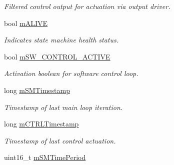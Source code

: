 \begin{DoxyCompactItemize}
\begin{DoxyCompactList}\small\item\em Filtered control output for actuation via output driver. \end{DoxyCompactList}\item 
bool \hyperlink{classSPMB_1_1StateMachine_a856ca0d82b6c3da4d60c1a52d6982faf}{m\+A\+L\+I\+VE}\hypertarget{classSPMB_1_1StateMachine_a856ca0d82b6c3da4d60c1a52d6982faf}{}\label{classSPMB_1_1StateMachine_a856ca0d82b6c3da4d60c1a52d6982faf}

\begin{DoxyCompactList}\small\item\em Indicates state machine health status. \end{DoxyCompactList}\item 
bool \hyperlink{classSPMB_1_1StateMachine_ac0318161d8396b4190dfc57f2d7ca3e5}{m\+S\+W\+\_\+\+C\+O\+N\+T\+R\+O\+L\+\_\+\+A\+C\+T\+I\+VE}\hypertarget{classSPMB_1_1StateMachine_ac0318161d8396b4190dfc57f2d7ca3e5}{}\label{classSPMB_1_1StateMachine_ac0318161d8396b4190dfc57f2d7ca3e5}

\begin{DoxyCompactList}\small\item\em Activation boolean for software control loop. \end{DoxyCompactList}\item 
long \hyperlink{classSPMB_1_1StateMachine_a372848ebc671d9a34982345bc90a255d}{m\+S\+M\+Timestamp}\hypertarget{classSPMB_1_1StateMachine_a372848ebc671d9a34982345bc90a255d}{}\label{classSPMB_1_1StateMachine_a372848ebc671d9a34982345bc90a255d}

\begin{DoxyCompactList}\small\item\em Timestamp of last main loop iteration. \end{DoxyCompactList}\item 
long \hyperlink{classSPMB_1_1StateMachine_ab8b439f683f473ae15201e3928a279b1}{m\+C\+T\+R\+L\+Timestamp}\hypertarget{classSPMB_1_1StateMachine_ab8b439f683f473ae15201e3928a279b1}{}\label{classSPMB_1_1StateMachine_ab8b439f683f473ae15201e3928a279b1}

\begin{DoxyCompactList}\small\item\em Timestamp of last control actuation. \end{DoxyCompactList}\item 
uint16\+\_\+t \hyperlink{classSPMB_1_1StateMachine_af09b596c6c80e052807b56779d14903d}{m\+S\+M\+Time\+Period}\hypertarget{classSPMB_1_1StateMachine_af09b596c6c80e052807b56779d14903d}{}\label{classSPMB_1_1StateMachine_af09b596c6c80e052807b56779d14903d}


\end{DoxyCompactItemize}
